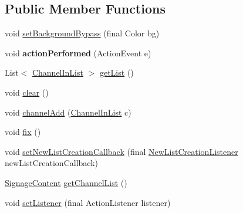 \subsection*{Public Member Functions}
\begin{DoxyCompactItemize}
\item 
void \hyperlink{classgov_1_1fnal_1_1ppd_1_1dd_1_1channel_1_1list_1_1ChannelListGUI_a0248f91962f51286514741ca3ae22be5}{set\-Background\-Bypass} (final Color bg)
\item 
\hypertarget{classgov_1_1fnal_1_1ppd_1_1dd_1_1channel_1_1list_1_1ChannelListGUI_a12130d6b9b424cbf7c04999edd338e91}{void {\bfseries action\-Performed} (Action\-Event e)}\label{classgov_1_1fnal_1_1ppd_1_1dd_1_1channel_1_1list_1_1ChannelListGUI_a12130d6b9b424cbf7c04999edd338e91}

\item 
List$<$ \hyperlink{interfacegov_1_1fnal_1_1ppd_1_1dd_1_1channel_1_1ChannelInList}{Channel\-In\-List} $>$ \hyperlink{classgov_1_1fnal_1_1ppd_1_1dd_1_1channel_1_1list_1_1ChannelListGUI_a3f5795ae59811730376ca998cca2df38}{get\-List} ()
\item 
void \hyperlink{classgov_1_1fnal_1_1ppd_1_1dd_1_1channel_1_1list_1_1ChannelListGUI_a49d5de5df273113318fc59de3d298967}{clear} ()
\item 
void \hyperlink{classgov_1_1fnal_1_1ppd_1_1dd_1_1channel_1_1list_1_1ChannelListGUI_aac2bcf918b3c9685681739a3dcbdf9c4}{channel\-Add} (\hyperlink{interfacegov_1_1fnal_1_1ppd_1_1dd_1_1channel_1_1ChannelInList}{Channel\-In\-List} c)
\item 
void \hyperlink{classgov_1_1fnal_1_1ppd_1_1dd_1_1channel_1_1list_1_1ChannelListGUI_a8baf2ca96aea0b400f39ce50297f191b}{fix} ()
\item 
void \hyperlink{classgov_1_1fnal_1_1ppd_1_1dd_1_1channel_1_1list_1_1ChannelListGUI_aab16046287399636afa75b7d299c2048}{set\-New\-List\-Creation\-Callback} (final \hyperlink{interfacegov_1_1fnal_1_1ppd_1_1dd_1_1channel_1_1list_1_1NewListCreationListener}{New\-List\-Creation\-Listener} new\-List\-Creation\-Callback)
\item 
\hyperlink{interfacegov_1_1fnal_1_1ppd_1_1dd_1_1signage_1_1SignageContent}{Signage\-Content} \hyperlink{classgov_1_1fnal_1_1ppd_1_1dd_1_1channel_1_1list_1_1ChannelListGUI_aec3f27a75e070f286225a7e8e69aeca1}{get\-Channel\-List} ()
\item 
void \hyperlink{classgov_1_1fnal_1_1ppd_1_1dd_1_1channel_1_1list_1_1ChannelListGUI_ac4fca92d4bc81f9ed0ba0c53b31a07e7}{set\-Listener} (final Action\-Listener listener)
\end{DoxyCompactItemize}
